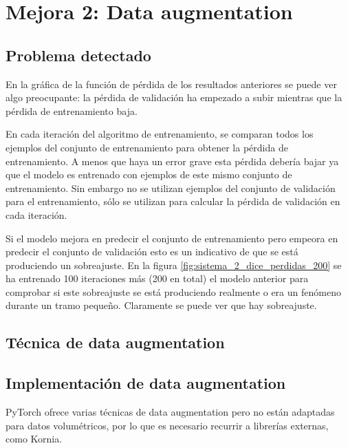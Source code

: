 \chapter{Mejora 2: Data augmentation}\label{data_augmentation}

\section{Problema detectado}\label{sec:data_augmentation_problem}

En la gráfica de la función de pérdida de los resultados anteriores se puede ver algo preocupante: la pérdida de validación ha empezado a subir mientras que la pérdida de entrenamiento baja.

En cada iteración del algoritmo de entrenamiento, se comparan todos los ejemplos del conjunto de entrenamiento para obtener la pérdida de entrenamiento. A menos que haya un error grave esta pérdida debería bajar ya que el modelo es entrenado con ejemplos de este mismo conjunto de entrenamiento. Sin embargo no se utilizan ejemplos del conjunto de validación para el entrenamiento, sólo se utilizan para calcular la pérdida de validación en cada iteración.

Si el modelo mejora en predecir el conjunto de entrenamiento pero empeora en predecir el conjunto de validación esto es un indicativo de que se está produciendo un sobreajuste. En la figura \ref{fig:sistema_2_dice_perdidas_200} se ha entrenado 100 iteraciones más (200 en total) el modelo anterior para comprobar si este sobreajuste se está produciendo realmente o era un fenómeno durante un tramo pequeño. Claramente se puede ver que hay sobreajuste.


\section{Técnica de data augmentation}\label{sec:data_augmentation_change}

\section{Implementación de data augmentation}\label{sec:data_augmentation_change}

PyTorch ofrece varias técnicas de data augmentation pero no están adaptadas para datos volumétricos, por lo que es necesario recurrir a librerías externas, como Kornia.

